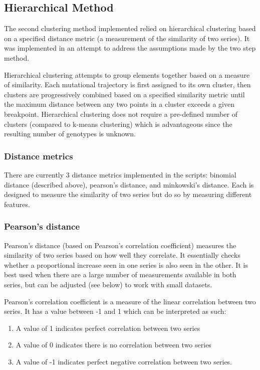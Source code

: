 \documentclass{report}
\begin{document}
\subsection{Hierarchical Method}
The second clustering method implemented relied on hierarchical clustering based on a specified distance metric (a measurement of the similarity of two series). 
It was implemented in an attempt to address the assumptions made by the two step method.

Hierarchical clustering attempts to group elements together based on a measure of similarity. 
Each mutational trajectory is first assigned to its own cluster, 
then clusters are progressively combined based on a specified similarity metric until the maximum distance between any two points in a cluster exceeds a given breakpoint. 
Hierarchical clustering does not require a pre-defined number of clusters (compared to k-means clustering) 
which is advantageous since the resulting number of genotypes is unknown.

\subsubsection{Distance metrics}
There are currently 3 distance metrics implemented in the scripts: binomial distance (described above), pearson's distance, and minkowski's distance. 
Each is designed to measure the similarity of two series but do so by measuring different features.


\subsubsection{Pearson's distance}
Pearson's distance (based on Pearson's correlation coefficient) measures the similarity of two series based on how well they correlate. 
It essentially checks whether a proportional increase seen in one series is also seen in the other. 
It is best used when there are a large number of measurements available in both series, but can be adjusted (see below) to work with small datasets.

Pearson's correlation coefficient is a measure of the linear correlation between two series.
It has a value between -1 and 1 which can be interpreted as such:
\begin{enumerate}
  \item A value of 1 indicates perfect correlation between two series
  \item A value of 0 indicates there is no correlation between two series
  \item A value of -1 indicates perfect negative correlation between two series.
\end{enumerate}
\end{document}
